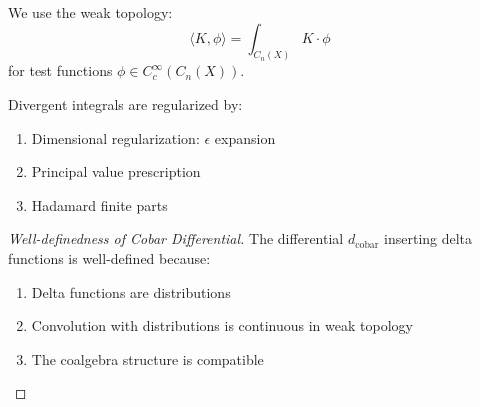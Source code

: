 \begin{theorem}[Topology]
We use the weak topology:
$$\langle K, \phi \rangle = \int_{C_n(X)} K \cdot \phi$$
for test functions $\phi \in C_c^\infty(C_n(X))$.
\end{theorem}

\begin{lemma}[Regularization]
Divergent integrals are regularized by:
\begin{enumerate}
\item Dimensional regularization: $\epsilon$ expansion
\item Principal value prescription
\item Hadamard finite parts
\end{enumerate}
\end{lemma}

\begin{proof}[Well-definedness of Cobar Differential]
The differential $d_{\text{cobar}}$ inserting delta functions is well-defined because:
\begin{enumerate}
\item Delta functions are distributions
\item Convolution with distributions is continuous in weak topology
\item The coalgebra structure is compatible
\end{enumerate}
\end{proof}


